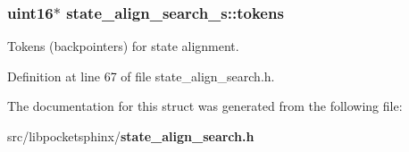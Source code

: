 \subsubsection[{tokens}]{\setlength{\rightskip}{0pt plus 5cm}uint16$\ast$ state\-\_\-align\-\_\-search\-\_\-s\-::tokens}\label{structstate__align__search__s_ab4b6f67b07b2e9d48a0af31474c5e29b}


Tokens (backpointers) for state alignment. 



Definition at line 67 of file state\-\_\-align\-\_\-search.\-h.



The documentation for this struct was generated from the following file\-:\begin{DoxyCompactItemize}
\item 
src/libpocketsphinx/{\bf state\-\_\-align\-\_\-search.\-h}\end{DoxyCompactItemize}
